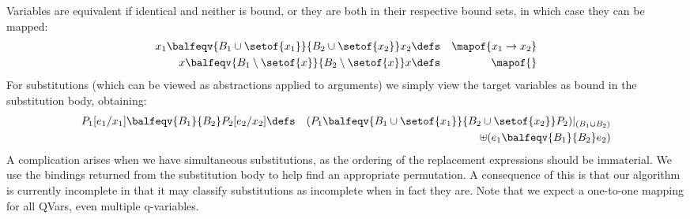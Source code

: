 Variables are equivalent if identical and neither is bound,
or they are both in their respective bound sets,
in which case they can be mapped:
\begin{eqnarray*}
   x_1 \balfeqv{B_1 \cup \setof{x_1}}{B_2\cup\setof{x_2}} x_2
   &\defs& \mapof{x_1 \to x_2}
\\ x \balfeqv{B_1 \setminus \setof{x}}{B_2 \setminus\setof{x}} x
   &\defs& \mapof{}
\end{eqnarray*}
For substitutions (which can be viewed as abstractions applied
to arguments) we simply view the target variables
as bound in the substitution body, obtaining:
\begin{eqnarray*}
   P_1[e_1/x_1] \balfeqv{B_1}{B_2} P_2[e_2/x_2]
   &\defs&
   (P_1 \balfeqv{B_1 \cup \setof{x_1}}{B_2\cup\setof{x_2}} P_2)
   |_{(B_1 \cup B_2)}
\\ && \uplus (e_1 \balfeqv{B_1}{B_2}  e_2)
\end{eqnarray*}
A complication arises when we have simultaneous substitutions,
as the ordering of the replacement expressions should be immaterial.
We use the bindings returned from the substitution body
to help find an appropriate permutation.
A consequence of this is that our algorithm is currently incomplete
in that it may classify substitutions as incomplete when in fact they
are.
Note that we expect a one-to-one mapping for all QVars,
even multiple q-variables.